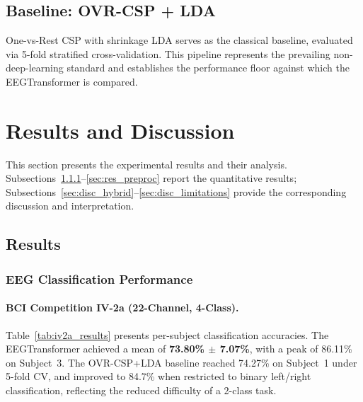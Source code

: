 \documentclass[12pt, a4paper]{article}
\begin{document}
\subsection{Baseline: OVR-CSP + LDA}

One-vs-Rest CSP with shrinkage LDA serves as the classical baseline, evaluated via 5-fold stratified cross-validation. This pipeline represents the prevailing non-deep-learning standard and establishes the performance floor against which the EEGTransformer is compared.

\section{Results and Discussion}

This section presents the experimental results and their analysis. Subsections~\ref{sec:res_class}--\ref{sec:res_preproc} report the quantitative results; Subsections~\ref{sec:disc_hybrid}--\ref{sec:disc_limitations} provide the corresponding discussion and interpretation.

\subsection{Results}

\subsubsection{EEG Classification Performance}
\label{sec:res_class}

\paragraph{BCI Competition IV-2a (22-Channel, 4-Class).}

Table~\ref{tab:iv2a_results} presents per-subject classification accuracies. The EEGTransformer achieved a mean of \textbf{73.80\% $\pm$ 7.07\%}, with a peak of 86.11\% on Subject~3. The OVR-CSP+LDA baseline reached 74.27\% on Subject~1 under 5-fold CV, and improved to 84.7\% when restricted to binary left/right classification, reflecting the reduced difficulty of a 2-class task.
\end{document}
